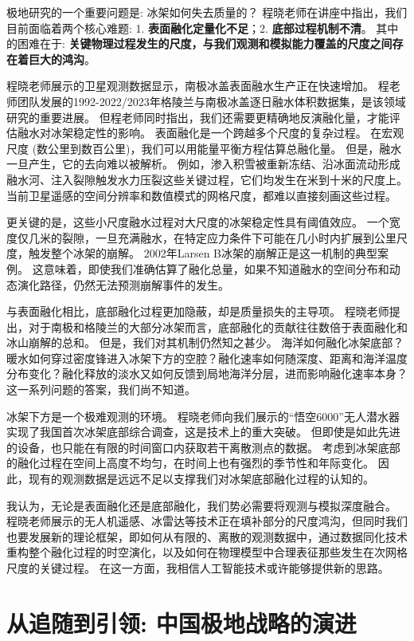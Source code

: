 \documentclass[12pt, a4paper]{article}
\begin{document}
极地研究的一个重要问题是: 冰架如何失去质量的？
程晓老师在讲座中指出，我们目前面临着两个核心难题: 1. \textbf{表面融化定量化不足}；2. \textbf{底部过程机制不清}。
其中的困难在于: \textbf{关键物理过程发生的尺度，与我们观测和模拟能力覆盖的尺度之间存在着巨大的鸿沟}。

程晓老师展示的卫星观测数据显示，南极冰盖表面融水生产正在快速增加。
程老师团队发展的1992-2022/2023年格陵兰与南极冰盖逐日融水体积数据集，是该领域研究的重要进展。
但程老师同时指出，我们还需要更精确地反演融化量，才能评估融水对冰架稳定性的影响。
表面融化是一个跨越多个尺度的复杂过程。
在宏观尺度 (数公里到数百公里)，我们可以用能量平衡方程估算总融化量。
但是，融水一旦产生，它的去向难以被解析。
例如，渗入积雪被重新冻结、沿冰面流动形成融水河、注入裂隙触发水力压裂这些关键过程，它们均发生在米到十米的尺度上。
当前卫星遥感的空间分辨率和数值模式的网格尺度，都难以直接刻画这些过程。

更关键的是，这些小尺度融水过程对大尺度的冰架稳定性具有阈值效应。
一个宽度仅几米的裂隙，一旦充满融水，在特定应力条件下可能在几小时内扩展到公里尺度，触发整个冰架的崩解。
2002年Larsen B冰架的崩解正是这一机制的典型案例。
这意味着，即使我们准确估算了融化总量，如果不知道融水的空间分布和动态演化路径，仍然无法预测崩解事件的发生。

与表面融化相比，底部融化过程更加隐蔽，却是质量损失的主导项。
程晓老师提出，对于南极和格陵兰的大部分冰架而言，底部融化的贡献往往数倍于表面融化和冰山崩解的总和。
但是，我们对其机制仍然知之甚少。
海洋如何融化冰架底部？暖水如何穿过密度锋进入冰架下方的空腔？融化速率如何随深度、距离和海洋温度分布变化？融化释放的淡水又如何反馈到局地海洋分层，进而影响融化速率本身？
这一系列问题的答案，我们尚不知道。

冰架下方是一个极难观测的环境。
程晓老师向我们展示的“悟空6000”无人潜水器实现了我国首次冰架底部综合调查，这是技术上的重大突破。
但即使是如此先进的设备，也只能在有限的时间窗口内获取若干离散测点的数据。
考虑到冰架底部的融化过程在空间上高度不均匀，在时间上也有强烈的季节性和年际变化。
因此，现有的观测数据是远远不足以支撑我们对冰架底部融化过程的认知的。

我认为，无论是表面融化还是底部融化，我们势必需要将观测与模拟深度融合。
程晓老师展示的无人机遥感、冰雷达等技术正在填补部分的尺度鸿沟，但同时我们也要发展新的理论框架，即如何从有限的、离散的观测数据中，通过数据同化技术重构整个融化过程的时空演化，以及如何在物理模型中合理表征那些发生在次网格尺度的关键过程。
在这一方面，我相信人工智能技术或许能够提供新的思路。



\section{从追随到引领: 中国极地战略的演进}
\end{document}
